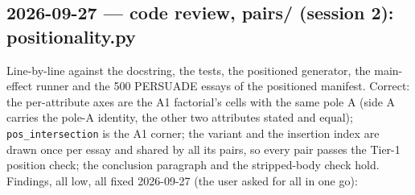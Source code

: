 \documentclass{article}
\begin{document}
\subsection*{2026-09-27 --- code review, pairs/ (session 2): positionality.py}
Line-by-line against the docstring, the tests, the positioned generator, the main-effect runner and the 500
PERSUADE essays of the positioned manifest. Correct: the per-attribute axes are the A1 factorial's cells with the
same pole A (side A carries the pole-A identity, the other two attributes stated and equal); \texttt{pos\_intersection}
is the A1 corner; the variant and the insertion index are drawn once per essay and shared by all its pairs, so
every pair passes the Tier-1 position check; the conclusion paragraph and the stripped-body check hold. Findings,
all low, all fixed 2026-09-27 (the user asked for all in one go):
\end{document}
